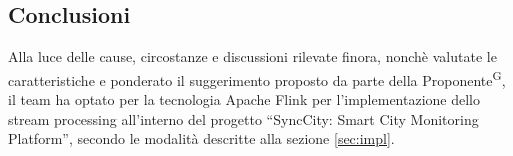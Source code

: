 \documentclass[8pt]{article}
\newcommand{\glossterm}[1]{#1\textsuperscript{G}} %
\begin{document}
\subsection{Conclusioni}
Alla luce delle cause, circostanze e discussioni rilevate finora, nonchè valutate le caratteristiche e ponderato il suggerimento proposto da parte della \glossterm{Proponente}, il team ha optato per la tecnologia Apache Flink per l'implementazione dello stream processing all'interno del progetto ``SyncCity: Smart City Monitoring Platform'', secondo le modalità descritte alla sezione \ref{sec:impl}.
\end{document}
